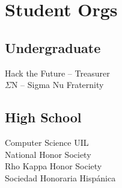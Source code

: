 \documentclass[letterpaper]{deedy-resume} %
\begin{document}
\begin{minipage}[t]{0.33\textwidth}
\section{Student Orgs}

\subsection{Undergraduate}

Hack the Future -- Treasurer \\
$\Sigma$N -- Sigma Nu Fraternity
\sectionspace %


\subsection{High School}

Computer Science UIL  \\
National Honor Society \\
Rho Kappa Honor Society \\
Sociedad Honoraria Hispánica \\

\sectionspace %


\end{minipage} %
\hfill
%
%
\end{document}
